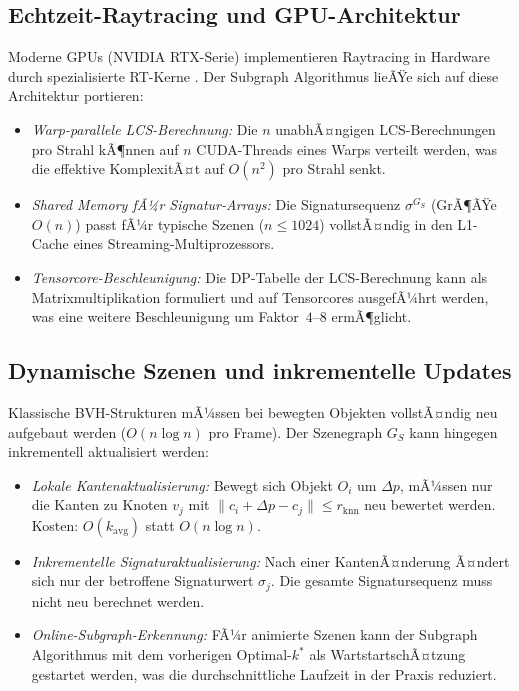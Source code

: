 ﻿\documentclass[a4paper,12pt]{article}
\theoremstyle{definition}
\begin{document}
\subsection{Echtzeit-Raytracing und GPU-Architektur}

Moderne GPUs (NVIDIA RTX-Serie) implementieren Raytracing in
Hardware durch spezialisierte RT-Kerne \citep{Parker2010}.
Der Subgraph Algorithmus lieÃŸe sich auf diese Architektur
portieren:

\begin{itemize}
  \item \emph{Warp-parallele LCS-Berechnung:} Die $n$ unabhÃ¤ngigen
        LCS-Berechnungen pro Strahl kÃ¶nnen auf $n$ CUDA-Threads
        eines Warps verteilt werden, was die effektive KomplexitÃ¤t
        auf $O(n^2)$ pro Strahl senkt.
  \item \emph{Shared Memory fÃ¼r Signatur-Arrays:} Die Signatursequenz
        $\sigma^{G_S}$ (GrÃ¶ÃŸe $O(n)$) passt fÃ¼r typische Szenen
        ($n \leq 1024$) vollstÃ¤ndig in den L1-Cache eines
        Streaming-Multiprozessors.
  \item \emph{Tensorcore-Beschleunigung:} Die DP-Tabelle der
        LCS-Berechnung kann als Matrixmultiplikation formuliert
        und auf Tensorcores ausgefÃ¼hrt werden, was eine weitere
        Beschleunigung um Faktor~$4$--$8$ ermÃ¶glicht.
\end{itemize}

\subsection{Dynamische Szenen und inkrementelle Updates}

Klassische BVH-Strukturen mÃ¼ssen bei bewegten Objekten vollstÃ¤ndig
neu aufgebaut werden ($O(n \log n)$ pro Frame). Der Szenegraph $G_S$
kann hingegen inkrementell aktualisiert werden:

\begin{itemize}
  \item \emph{Lokale Kantenaktualisierung:} Bewegt sich Objekt $O_i$
        um $\Delta p$, mÃ¼ssen nur die Kanten zu Knoten $v_j$ mit
        $\|c_i + \Delta p - c_j\| \leq r_{\mathrm{knn}}$ neu
        bewertet werden. Kosten: $O(k_{\mathrm{avg}})$ statt
        $O(n \log n)$.
  \item \emph{Inkrementelle Signaturaktualisierung:} Nach einer
        KantenÃ¤nderung Ã¤ndert sich nur der betroffene Signaturwert
        $\sigma_j$. Die gesamte Signatursequenz muss nicht neu
        berechnet werden.
  \item \emph{Online-Subgraph-Erkennung:} FÃ¼r animierte Szenen
        kann der Subgraph Algorithmus mit dem vorherigen
        Optimal-$k^*$ als WartstartschÃ¤tzung gestartet werden,
        was die durchschnittliche Laufzeit in der Praxis
        reduziert.
\end{itemize}
\end{document}
